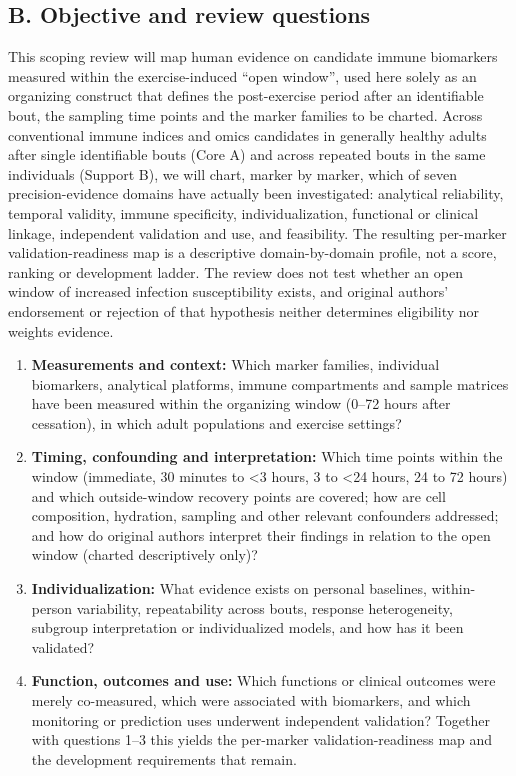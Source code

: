 \documentclass[
  11pt,
  a4paper,
]{article}
\providecommand{\tightlist}{%
  \setlength{\itemsep}{0pt}\setlength{\parskip}{0pt}}
\begin{document}
\subsection{B. Objective and review
questions}\label{b.-objective-and-review-questions}

This scoping review will map human evidence on candidate immune
biomarkers measured within the exercise-induced ``open window'', used
here solely as an organizing construct that defines the post-exercise
period after an identifiable bout, the sampling time points and the
marker families to be charted. Across conventional immune indices and
omics candidates in generally healthy adults after single identifiable
bouts (Core A) and across repeated bouts in the same individuals
(Support B), we will chart, marker by marker, which of seven
precision-evidence domains have actually been investigated: analytical
reliability, temporal validity, immune specificity, individualization,
functional or clinical linkage, independent validation and use, and
feasibility. The resulting per-marker validation-readiness map is a
descriptive domain-by-domain profile, not a score, ranking or
development ladder. The review does not test whether an open window of
increased infection susceptibility exists, and original authors'
endorsement or rejection of that hypothesis neither determines
eligibility nor weights evidence.

\begin{enumerate}
\def\labelenumi{\arabic{enumi}.}
\tightlist
\item
  \textbf{Measurements and context:} Which marker families, individual
  biomarkers, analytical platforms, immune compartments and sample
  matrices have been measured within the organizing window (0--72 hours
  after cessation), in which adult populations and exercise settings?
\item
  \textbf{Timing, confounding and interpretation:} Which time points
  within the window (immediate, 30 minutes to \textless3 hours, 3 to
  \textless24 hours, 24 to 72 hours) and which outside-window recovery
  points are covered; how are cell composition, hydration, sampling and
  other relevant confounders addressed; and how do original authors
  interpret their findings in relation to the open window (charted
  descriptively only)?
\item
  \textbf{Individualization:} What evidence exists on personal
  baselines, within-person variability, repeatability across bouts,
  response heterogeneity, subgroup interpretation or individualized
  models, and how has it been validated?
\item
  \textbf{Function, outcomes and use:} Which functions or clinical
  outcomes were merely co-measured, which were associated with
  biomarkers, and which monitoring or prediction uses underwent
  independent validation? Together with questions 1--3 this yields the
  per-marker validation-readiness map and the development requirements
  that remain.
\end{enumerate}
\end{document}
